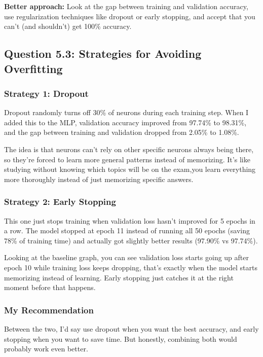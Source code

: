 \textbf{Better approach:} Look at the gap between training and validation accuracy, use regularization techniques like dropout or early stopping, and accept that you can't (and shouldn't) get 100\% accuracy.

\subsection{Question 5.3: Strategies for Avoiding Overfitting}

\subsubsection{Strategy 1: Dropout}

Dropout randomly turns off 30\% of neurons during each training step. When I added this to the MLP, validation accuracy improved from 97.74\% to 98.31\%, and the gap between training and validation dropped from 2.05\% to 1.08\%. 

The idea is that neurons can't rely on other specific neurons always being there, so they're forced to learn more general patterns instead of memorizing. It's like studying without knowing which topics will be on the exam,you learn everything more thoroughly instead of just memorizing specific answers.

\subsubsection{Strategy 2: Early Stopping}

This one just stops training when validation loss hasn't improved for 5 epochs in a row. The model stopped at epoch 11 instead of running all 50 epochs (saving 78\% of training time) and actually got slightly better results (97.90\% vs 97.74\%).

Looking at the baseline graph, you can see validation loss starts going up after epoch 10 while training loss keeps dropping, that's exactly when the model starts memorizing instead of learning. Early stopping just catches it at the right moment before that happens.

\subsubsection{My Recommendation}

Between the two, I'd say use dropout when you want the best accuracy, and early stopping when you want to save time. But honestly, combining both would probably work even better.